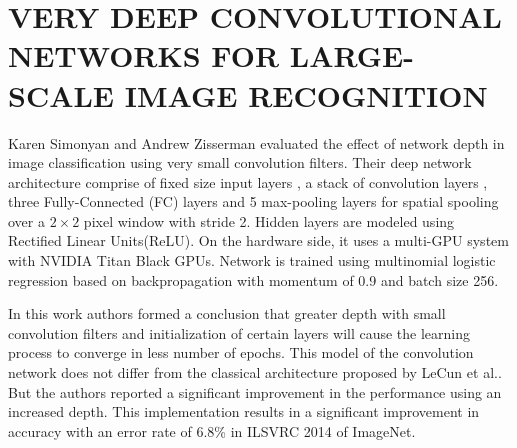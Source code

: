 \documentclass{article}
\begin{document}
\section{VERY DEEP CONVOLUTIONAL NETWORKS FOR LARGE-SCALE IMAGE RECOGNITION}
Karen Simonyan and Andrew Zisserman \cite{Arge2015} evaluated the effect of network depth in image classification using very small convolution filters. Their deep network architecture comprise of fixed  size input layers , a stack of convolution layers , three Fully-Connected (FC) layers and  5 max-pooling layers for spatial spooling  over a $2 \times 2$ pixel window with stride 2. Hidden layers are modeled using Rectified Linear Units(ReLU)\cite{Nair2010}. On the hardware side, it uses a multi-GPU system with NVIDIA Titan Black GPUs. Network is trained using multinomial logistic regression  based on backpropagation with momentum of 0.9 and  batch size  256.
\par
 In this work authors formed a conclusion that greater depth with small convolution filters and  initialization of certain layers will cause the learning process to converge in less number  of epochs. This model of the convolution network does not differ from the classical architecture proposed by  LeCun et al.\cite{LeCun1998}. But the authors reported a significant improvement in the performance using an increased depth.  This implementation results in a significant improvement in accuracy with  an error rate of  6.8\% in  ILSVRC 2014 of ImageNet.
\end{document}
